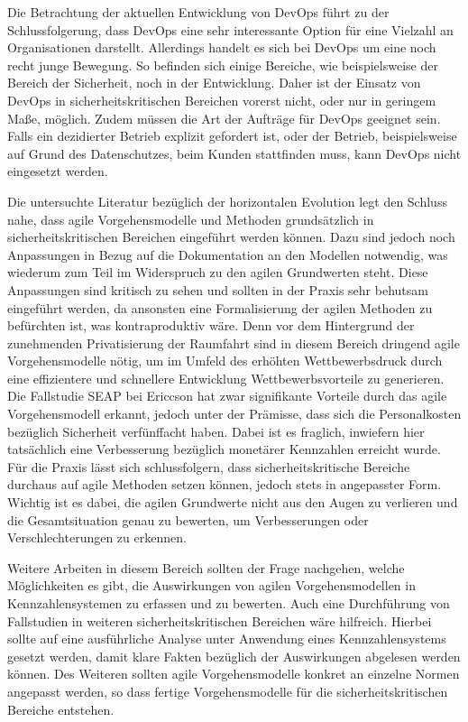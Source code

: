Die Betrachtung der aktuellen Entwicklung von DevOps führt zu der Schlussfolgerung, dass DevOps eine sehr interessante Option für eine Vielzahl an Organisationen darstellt. 
Allerdings handelt es sich bei DevOps um eine noch recht junge Bewegung. 
So befinden sich einige Bereiche, wie beispielsweise der Bereich der Sicherheit, noch in der Entwicklung. 
Daher ist der Einsatz von DevOps in sicherheitskritischen Bereichen vorerst nicht, oder nur in geringem Maße, möglich. Zudem müssen die Art der Aufträge für DevOps geeignet sein. 
Falls ein dezidierter Betrieb explizit gefordert ist, oder der Betrieb, beispielsweise auf Grund des Datenschutzes, beim Kunden stattfinden muss, kann DevOps nicht eingesetzt werden.

Die untersuchte Literatur bezüglich der horizontalen Evolution legt den Schluss nahe, dass agile Vorgehensmodelle und Methoden grundsätzlich in sicherheitskritischen Bereichen eingeführt werden können.
Dazu sind jedoch noch Anpassungen in Bezug auf die Dokumentation an den Modellen notwendig, was wiederum zum Teil im Widerspruch zu den agilen Grundwerten steht.
Diese Anpassungen sind kritisch zu sehen und sollten in der Praxis sehr behutsam eingeführt werden, da ansonsten eine Formalisierung der agilen Methoden zu befürchten ist, was kontraproduktiv wäre.
Denn vor dem Hintergrund der zunehmenden Privatisierung der Raumfahrt sind in diesem Bereich dringend agile Vorgehensmodelle nötig, um im Umfeld des erhöhten Wettbewerbsdruck durch eine effizientere und schnellere Entwicklung Wettbewerbsvorteile zu generieren.
Die Fallstudie SEAP bei Ericcson hat zwar signifikante Vorteile durch das agile Vorgehensmodell erkannt, jedoch unter der Prämisse, dass sich die Personalkosten bezüglich Sicherheit verfünffacht haben.
Dabei ist es fraglich, inwiefern hier tatsächlich eine Verbesserung bezüglich monetärer Kennzahlen erreicht wurde.
Für die Praxis lässt sich schlussfolgern, dass sicherheitskritische Bereiche durchaus auf agile Methoden setzen können, jedoch stets in angepasster Form.
Wichtig ist es dabei, die agilen Grundwerte nicht aus den Augen zu verlieren und die Gesamtsituation genau zu bewerten, um Verbesserungen oder Verschlechterungen zu erkennen.

Weitere Arbeiten in diesem Bereich sollten der Frage nachgehen, welche Möglichkeiten es gibt, die Auswirkungen von agilen Vorgehensmodellen in Kennzahlensystemen zu erfassen und zu bewerten.
Auch eine Durchführung von Fallstudien in weiteren sicherheitskritischen Bereichen wäre hilfreich. 
Hierbei sollte auf eine ausführliche Analyse unter Anwendung eines Kennzahlensystems gesetzt werden, damit klare Fakten bezüglich der Auswirkungen abgelesen werden können.
Des Weiteren sollten agile Vorgehensmodelle konkret an einzelne Normen angepasst werden, so dass fertige Vorgehensmodelle für die sicherheitskritischen Bereiche entstehen.

